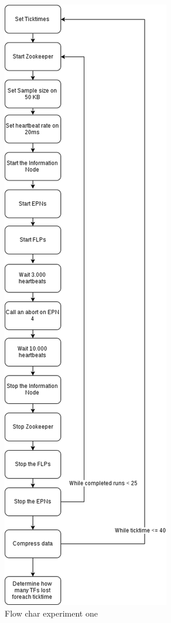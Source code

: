 \begin{figure}
    \centering
    \includegraphics[scale=0.3]{./graphics/ex1.png}
    \caption{Flow char experiment one}
\end{figure}

